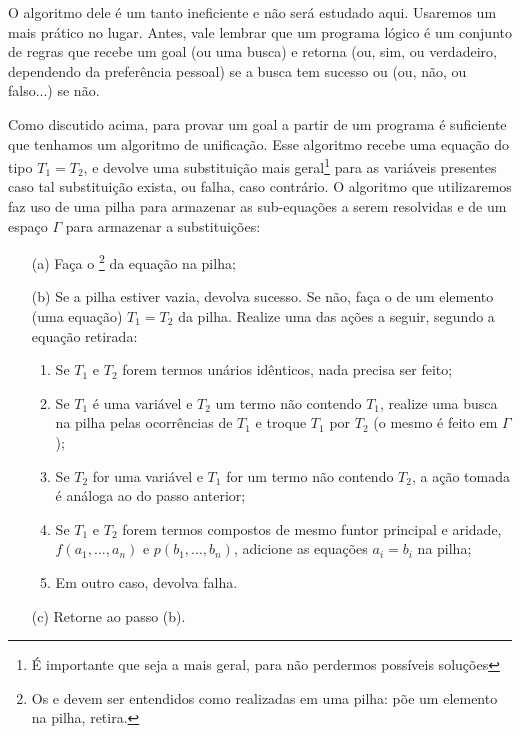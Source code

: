 O algoritmo dele é um tanto ineficiente e não será estudado aqui. Usaremos um mais prático no lugar. Antes, vale lembrar que um programa lógico é um conjunto de regras que recebe um goal (ou uma busca) e retorna  (ou, sim, ou verdadeiro, dependendo da preferência pessoal) se a busca tem sucesso ou  (ou, não, ou falso...) se não.

Como discutido acima, para provar um goal a partir de um programa é suficiente que tenhamos um algoritmo de unificação. Esse algoritmo recebe uma equação do tipo $T_1 = T_2$, e devolve uma substituição mais geral\footnote{É importante que seja a mais geral, para não perdermos possíveis soluções}
para as variáveis presentes caso tal substituição exista, ou falha, caso contrário. O algoritmo que utilizaremos faz uso de uma pilha para armazenar as sub-equações a serem resolvidas e de um espaço
$\Gamma$ para armazenar a substituições:

\begin{itemize}
    \item[(a)] Faça o \footnote{Os  e  devem ser entendidos como realizadas em uma pilha:  põe um elemento na pilha,  retira.} da equação na pilha;
    \item[(b)] Se a pilha estiver vazia, devolva sucesso. Se não, faça o  de um elemento (uma equação) $T_1 = T_2$ da pilha. Realize uma das ações a seguir, segundo a equação retirada:
      \begin{enumerate}
        \item Se $T_1$ e $T_2$ forem termos unários idênticos, nada precisa ser feito;
        \item Se $T_1$ é uma variável e $T_2$ um termo não contendo $T_1$, realize uma busca na pilha pelas ocorrências de $T_1$ e troque $T_1$ por $T_2$ (o mesmo é feito em $\Gamma$);
        \item Se $T_2$ for uma variável e $T_1$ for um termo não contendo $T_2$, a ação tomada é análoga ao do passo anterior;
        \item Se $T_1$ e $T_2$ forem termos compostos de mesmo funtor principal e aridade, $f(a_1, ..., a_n)$ e $p(b_1, ..., b_n)$, adicione as equações $a_i = b_i$ na pilha;
        \item Em outro caso, devolva falha.
      \end{enumerate}
    \item[(c)] Retorne ao passo (b).
\end{itemize}







